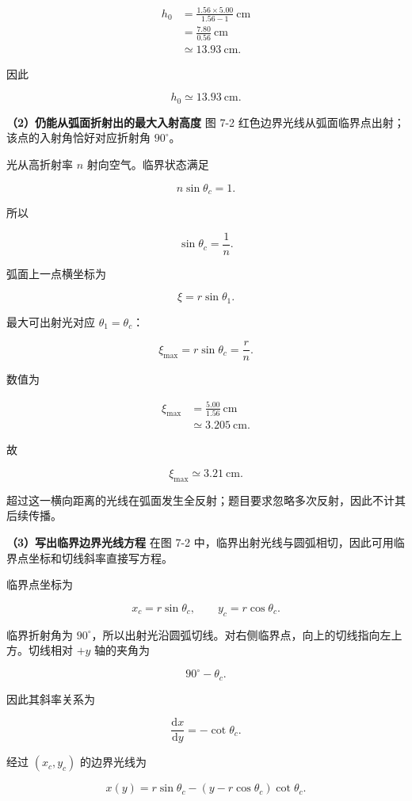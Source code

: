 \documentclass[12pt,a4paper,UTF8]{ctexart}
\begin{document}
\[
\begin{aligned}
h_0
&=\frac{1.56\times5.00}{1.56-1}\ \mathrm{cm}\\
&=\frac{7.80}{0.56}\ \mathrm{cm}\\
&\simeq13.93\ \mathrm{cm}.
\end{aligned}
\]

因此

\[\boxed{h_0\simeq13.93\ \mathrm{cm}}.\]

\textbf{（2）仍能从弧面折射出的最大入射高度} 图 7-2
红色边界光线从弧面临界点出射；该点的入射角恰好对应折射角 \(90^\circ\)。

光从高折射率 \(n\) 射向空气。临界状态满足

\[
n\sin\theta_c=1.
\]

所以

\[
\boxed{\sin\theta_c=\frac1n}.
\]

弧面上一点横坐标为

\[\xi=r\sin\theta_1.\]

最大可出射光对应 \(\theta_1=\theta_c\)：

\[
\xi_{\max}=r\sin\theta_c=\frac rn.
\]

数值为

\[
\begin{aligned}
\xi_{\max}
&=\frac{5.00}{1.56}\ \mathrm{cm}\\
&\simeq3.205\ \mathrm{cm}.
\end{aligned}
\]

故

\[\boxed{\xi_{\max}\simeq3.21\ \mathrm{cm}}.\]

超过这一横向距离的光线在弧面发生全反射；题目要求忽略多次反射，因此不计其后续传播。

\textbf{（3）写出临界边界光线方程} 在图 7-2
中，临界出射光线与圆弧相切，因此可用临界点坐标和切线斜率直接写方程。

临界点坐标为

\[
x_c=r\sin\theta_c,
\qquad
y_c=r\cos\theta_c.
\]

临界折射角为
\(90^\circ\)，所以出射光沿圆弧切线。对右侧临界点，向上的切线指向左上方。切线相对
\(+y\) 轴的夹角为

\[90^\circ-\theta_c.\]

因此其斜率关系为

\[
\frac{\mathrm{d}x}{\mathrm{d}y}=-\cot\theta_c.
\]

经过 \((x_c,y_c)\) 的边界光线为

\[
\boxed{
x(y)=r\sin\theta_c
-(y-r\cos\theta_c)\cot\theta_c
}.
\]
\end{document}
